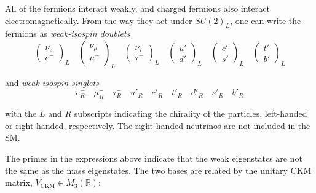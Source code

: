     All of the fermions interact weakly, and charged fermions also interact electromagnetically.
    From the way they act under $SU(2)_L$, one can write the fermions as \textit{weak-isospin doublets}
    \begin{equation*}
        \begin{pmatrix}
            \nu_e \\
            e^-
        \end{pmatrix}_L
        \quad
        \begin{pmatrix}
            \nu_\mu \\
            \mu^-
        \end{pmatrix}_L
        \quad
        \begin{pmatrix}
            \nu_\tau \\
            \tau^-
        \end{pmatrix}_L
        \quad
        \begin{pmatrix}
            u' \\
            d'
        \end{pmatrix}_L
        \quad
        \begin{pmatrix}
            c' \\
            s'
        \end{pmatrix}_L
        \quad
        \begin{pmatrix}
            t' \\
            b'
        \end{pmatrix}_L
    \end{equation*}

    and \textit{weak-isospin singlets}
    \begin{equation*}
        e^-_R
        \quad
        \mu^-_R
        \quad
        \tau^-_R
        \quad
        u'_R
        \quad
        c'_R
        \quad
        t'_R
        \quad
        d'_R
        \quad
        s'_R
        \quad
        b'_R
    \end{equation*}

with the $L$ and $R$ subscripts indicating the chirality of the particles, left-handed or right-handed, respectively.
The right-handed neutrinos are not included in the \gls{SM}.

The primes in the expressions above indicate that the weak eigenstates are not the same as the mass eigenstates. 
The two bases are related by the unitary \gls{CKM} matrix, $V_{\text{CKM}} \in M_3\left(\mathbb{R}\right)$:

